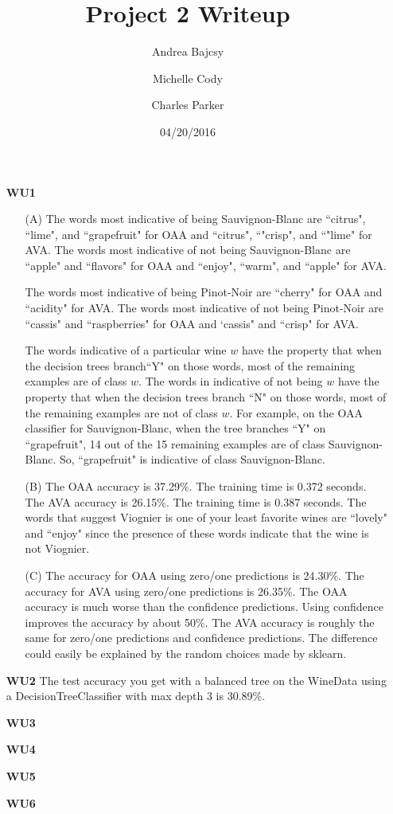 \documentclass{article}
\title{Project 2 Writeup}
\date{04/20/2016}
\author{Andrea Bajcsy \and Michelle Cody \and Charles Parker }
\begin{document}
	\maketitle
	
	\begin{enumerate}
	
	\item[\textbf{WU1}]
	
	\begin{enumerate}
		\item[(A)] 	 The words most indicative of being Sauvignon-Blanc are ``citrus", ``lime", and ``grapefruit" for OAA and ``citrus", ``"crisp", and ``"lime" for AVA. The words most indicative of not being Sauvignon-Blanc are ``apple" and ``flavors" for OAA and ``enjoy", ``warm", and ``apple" for AVA.
		
		The words most indicative of being Pinot-Noir are ``cherry" for OAA and ``acidity" for AVA. The words most indicative of not being Pinot-Noir are ``cassis" and ``raspberries" for OAA and `cassis" and ``crisp" for AVA.
		
		The words indicative of a particular wine $w$ have the property that when the decision trees branch``Y" on those words, most of the remaining examples are of class $w$. The words in indicative of not being $w$ have the property that when the decision trees branch ``N" on those words, most of the remaining examples are not of class $w$. For example, on the OAA classifier for Sauvignon-Blanc, when the tree branches ``Y" on ``grapefruit", 14 out of the 15 remaining examples are of class Sauvignon-Blanc. So, ``grapefruit" is indicative of class Sauvignon-Blanc.
		
		\item[(B)] The OAA accuracy is 37.29\%. The training time is 0.372 seconds.  The AVA accuracy is 26.15\%.  The training time is 0.387 seconds. The words that suggest Viognier is one of your least favorite wines are ``lovely" and ``enjoy" since the presence of these words indicate that the wine is not Viognier.
		
		\item[(C)] The accuracy for OAA using zero/one predictions is 24.30\%. The accuracy for AVA using zero/one predictions is 26.35\%. The OAA accuracy is much worse than the confidence predictions. Using confidence improves the accuracy by about 50\%. The AVA accuracy is roughly the same for zero/one predictions and confidence predictions. The difference could easily be explained by the random choices made by sklearn.
	\end{enumerate}
	

	\item[\textbf{WU2}] The test accuracy you get with a balanced tree on the WineData using a DecisionTreeClassifier with max depth 3 is 30.89\%.
	
	\item[\textbf{WU3}] 
	
	\item[\textbf{WU4}] 
		
	\item[\textbf{WU5}] 
		
	\item[\textbf{WU6}]
	
	\end{enumerate}
\end{document}
